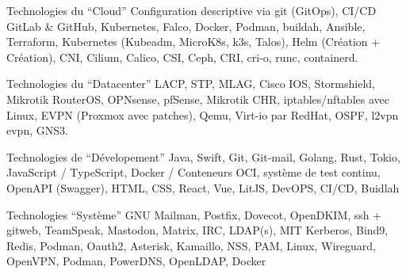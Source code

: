 
\begin{cvskills}

  \cvskill
    {Technologies du ``Cloud''}
    {
      Configuration descriptive via git (GitOps), CI/CD GitLab \& GitHub, \break
      Kubernetes, Falco, Docker, Podman, buildah, Ansible, Terraform, Kubernetes \break
      (Kubeadm, MicroK8s, k3s, Talos), Helm (Création + Création), \break 
      CNI, Cilium, Calico, CSI, Ceph, CRI, cri-o, runc, containerd.
    }

    \cvskill
    {Technologies du ``Datacenter''}
    {
      LACP, STP, MLAG, Cisco IOS, Stormshield, Mikrotik RouterOS, OPNsense, \break
      pfSense, Mikrotik CHR, iptables/nftables avec Linux, \break 
      EVPN (Proxmox avec patches), Qemu, Virt-io par RedHat, OSPF, \break
      l2vpn evpn, GNS3.
    }

    \cvskill
    {Technologies de ``Dévelopement''}
    {
      Java, Swift, Git, Git-mail, Golang, Rust, Tokio, JavaScript / TypeScript, \break 
      Docker / Conteneurs OCI, système de test continu, OpenAPI (Swagger), HTML, \break
       CSS, React, Vue, LitJS, DevOPS, CI/CD, Buidlah
    }

    \cvskill
    {Technologies ``Système''}
    {
      GNU Mailman, Postfix, Dovecot, OpenDKIM, ssh + gitweb, TeamSpeak, \break
       Mastodon, Matrix, IRC, LDAP(s), MIT Kerberos, Bind9, Redis, Podman, \break
       Oauth2, Asterisk, Kamaillo, NSS, PAM, Linux, Wireguard, OpenVPN,  \break
       Podman, PowerDNS, OpenLDAP, Docker
    }

\end{cvskills}
